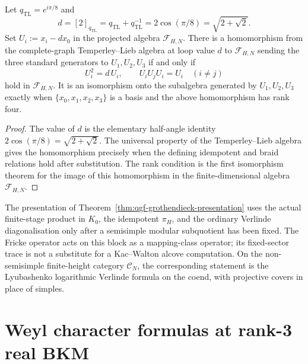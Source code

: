 \begin{corollary}[Temperley--Lieb quotient criterion at \texorpdfstring{$\ell = 8$}{l = 8}]
\label{cor:qgf-temperley-lieb-presentation-zeta8}
Let \(q_{\mathrm{TL}}=e^{i\pi/8}\) and
\[
d=[2]_{q_{\mathrm{TL}}}=q_{\mathrm{TL}}+q_{\mathrm{TL}}^{-1}
=2\cos(\pi/8)=\sqrt{2+\sqrt2}.
\]
Set \(U_i:=x_i-dx_0\) in the projected algebra \(\mathcal F_{H,N}\).
There is a homomorphism from the complete-graph Temperley--Lieb algebra
at loop value \(d\) to \(\mathcal F_{H,N}\) sending the three standard
generators to \(U_1,U_2,U_3\) if and only if
\[
 U_i^2=d\,U_i,\qquad
 U_iU_jU_i=U_i\quad (i\ne j)
\]
hold in \(\mathcal F_{H,N}\). It is an isomorphism onto the
subalgebra generated by \(U_1,U_2,U_3\) exactly when
\(\{x_0,x_1,x_2,x_3\}\) is a basis and the above homomorphism has
rank four.
\end{corollary}

\begin{proof}
The value of \(d\) is the elementary half-angle identity
\(2\cos(\pi/8)=\sqrt{2+\sqrt2}\). The universal property of the
Temperley--Lieb algebra gives the homomorphism precisely when the
defining idempotent and braid relations hold after substitution. The
rank condition is the first isomorphism theorem for the image of this
homomorphism in the finite-dimensional algebra \(\mathcal F_{H,N}\).
\end{proof}

\begin{remark}
\label{rem:qgf-presentation-fricke-consistency}
The presentation of Theorem~\ref{thm:qgf-grothendieck-presentation}
uses the actual finite-stage product in \(K_0\), the idempotent
\(\pi_H\), and the ordinary Verlinde diagonalisation only after a
semisimple modular subquotient has been fixed. The Fricke operator
acts on this block as a mapping-class operator; its fixed-sector trace
is not a substitute for a Kac--Walton alcove computation. On the
non-semisimple finite-height category \(\mathcal C_N\), the
corresponding statement is the Lyubashenko logarithmic Verlinde formula
on the coend, with projective covers in place of simples.
\end{remark}

\section{Weyl character formulas at rank-3 real BKM}
\label{sec:qgf-weyl-character}

